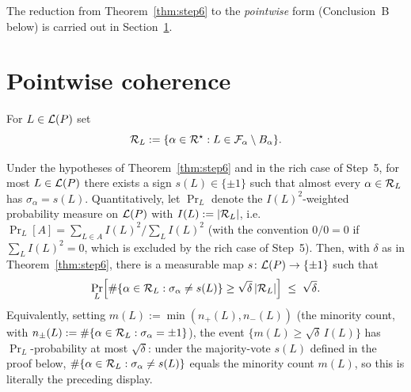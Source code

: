 The reduction from Theorem~\ref{thm:step6} to the \emph{pointwise} form
(Conclusion~B below) is carried out in Section~\ref{sec:pointwise}.

\section{Pointwise coherence}\label{sec:pointwise}

For $L\in\mathcal{L}(P)$ set
\[
\mathcal{R}_L
 := \{\alpha\in\mathcal{R}^\star :
      L\in\mathcal{F}_{\alpha}\setminus B_\alpha\}.
\]

\begin{corollary}\label{cor:pointwise}
Under the hypotheses of Theorem~\ref{thm:step6} and in the rich case of
Step~5, for most $L\in\mathcal{L}(P)$ there exists a sign $s(L)\in\{\pm1\}$ such
that almost every $\alpha\in\mathcal{R}_L$ has $\sigma_\alpha = s(L)$.
Quantitatively, let $\Pr_L$ denote the $I(L)^2$-weighted probability
measure on $\mathcal{L}(P)$ with $I(L):=|\mathcal{R}_L|$, i.e.
$\Pr_L[A]=\sum_{L\in A}I(L)^2/\sum_{L}I(L)^2$
(with the convention $0/0=0$ if $\sum_LI(L)^2=0$, which is excluded by
the rich case of Step~5).  Then, with $\delta$ as in
Theorem~\ref{thm:step6}, there is a measurable map
$s\colon\mathcal{L}(P)\to\{\pm1\}$ such that
\[
\Pr_L\!\left[
  \#\{\alpha\in\mathcal{R}_L:\sigma_\alpha\ne s(L)\}
  \ge \sqrt{\delta}\,|\mathcal{R}_L|
\right]
\;\le\; \sqrt{\delta}.
\]
Equivalently, setting $m(L):=\min(n_+(L),n_-(L))$ (the minority count,
with $n_\pm(L):=\#\{\alpha\in\mathcal{R}_L:\sigma_\alpha=\pm1\}$), the event
$\{m(L)\ge\sqrt{\delta}\,I(L)\}$ has $\Pr_L$-probability at most
$\sqrt{\delta}$: under the majority-vote $s(L)$ defined in the proof
below, $\#\{\alpha\in\mathcal{R}_L:\sigma_\alpha\ne s(L)\}$ equals the
minority count $m(L)$, so this is literally the preceding display.
\end{corollary}

